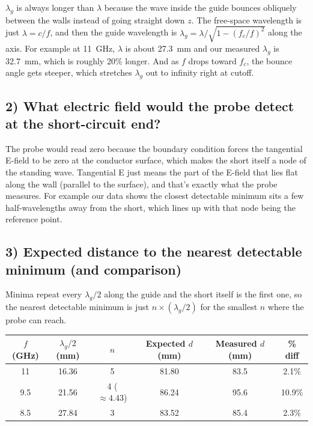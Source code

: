 \documentclass[11pt,letterpaper]{article}
\begin{document}
$\lambda_g$ is always longer than $\lambda$ because the wave inside the guide bounces obliquely between the walls instead of going straight down $z$. The free-space wavelength is just $\lambda = c/f$, and then the guide wavelength is $\lambda_g = \lambda/\sqrt{1 - (f_c/f)^2}$ along the axis. For example at 11~GHz, $\lambda$ is about 27.3~mm and our measured $\lambda_g$ is 32.7~mm, which is roughly 20\% longer. And as $f$ drops toward $f_c$, the bounce angle gets steeper, which stretches $\lambda_g$ out to infinity right at cutoff.

\subsection*{2) What electric field would the probe detect at the short-circuit end?}

The probe would read zero because the boundary condition forces the tangential E-field to be zero at the conductor surface, which makes the short itself a node of the standing wave. Tangential E just means the part of the E-field that lies flat along the wall (parallel to the surface), and that's exactly what the probe measures. For example our data shows the closest detectable minimum sits a few half-wavelengths away from the short, which lines up with that node being the reference point.

\subsection*{3) Expected distance to the nearest detectable minimum (and comparison)}

Minima repeat every $\lambda_g/2$ along the guide and the short itself is the first one, so the nearest detectable minimum is just $n\times(\lambda_g/2)$ for the smallest $n$ where the probe can reach.

\begin{center}
\begin{tabular}{cccccc}
\toprule
$f$ (GHz) & $\lambda_g/2$ (mm) & $n$ & Expected $d$ (mm) & Measured $d$ (mm) & \% diff \\
\midrule
11   & 16.36 & 5            & 81.80 & 83.5 & 2.1\%  \\
9.5  & 21.56 & 4 ($\approx4.43$) & 86.24 & 95.6 & 10.9\% \\
8.5  & 27.84 & 3            & 83.52 & 85.4 & 2.3\%  \\
\bottomrule
\end{tabular}
\end{center}
\end{document}
